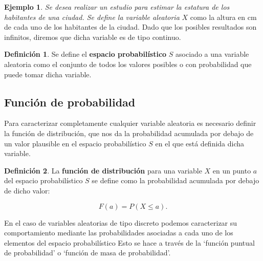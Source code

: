 \documentclass[
]{book}
\newenvironment{yellowbox}{
  \definecolor{shadecolor}{rgb}{210, 180, 140}  
  \color{black}
  \begin{shaded}}
 {\end{shaded}}
\theoremstyle{definition}
\newtheorem{definition}{Definición}[chapter]
\theoremstyle{definition}
\newtheorem{example}{Ejemplo}[chapter]
\theoremstyle{definition}
\theoremstyle{definition}
\theoremstyle{remark}
\begin{document}
\begin{example}
\protect\hypertarget{exm:rvdcontinua}{}\label{exm:rvdcontinua}\emph{Se desea realizar un estudio para estimar la estatura de los habitantes de una ciudad. Se define la variable aleatoria} \(X\) como la altura en cm de cada uno de los habitantes de la ciudad. Dado que los posibles resultados son infinitos, diremos que dicha variable es de tipo continuo.
\end{example}

\begin{yellowbox}

\begin{definition}
\protect\hypertarget{def:espacioprob}{}\label{def:espacioprob}Se define el \textbf{espacio probabilístico} \(S\) asociado a una variable aleatoria como el conjunto de todos los valores posibles o con probabilidad que puede tomar dicha variable.
\end{definition}

\end{yellowbox}

\hypertarget{funciuxf3n-de-probabilidad}{%
\subsection{Función de probabilidad}\label{funciuxf3n-de-probabilidad}}

Para caracterizar completamente cualquier variable aleatoria es necesario definir la función de distribución, que nos da la probabilidad acumulada por debajo de un valor plausible en el espacio probabilístico \(S\) en el que está definida dicha variable.

\begin{yellowbox}

\begin{definition}
\protect\hypertarget{def:fd}{}\label{def:fd}La \textbf{función de distribución} para una variable \(X\) en un punto \(a\) del espacio probabilístico \(S\) se define como la probabilidad acumulada por debajo de dicho valor:

\begin{equation*}
  F(a) = P(X \leq a).
\end{equation*}
\end{definition}

\end{yellowbox}

En el caso de variables aleatorias de tipo discreto podemos caracterizar su comportamiento mediante las probabilidades asociadas a cada uno de los elementos del espacio probabilístico Esto se hace a través de la `función puntual de probabilidad' o `función de masa de probabilidad'.
\end{document}
